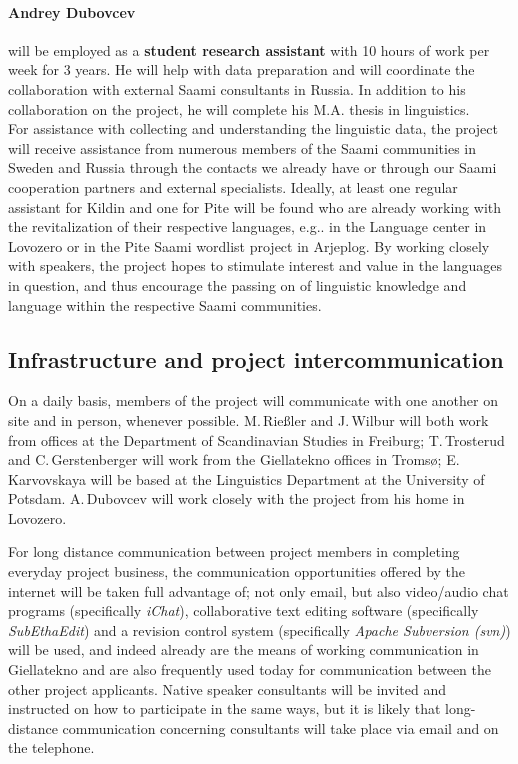 \documentclass[a4paper,12pt]{article}
\begin{document}
{{\paragraph{Andrey Dubovcev} will be employed as a \textbf{student research assistant} with 10 hours of work per week for 3 years. He will help with data preparation and will coordinate the collaboration with external Saami consultants in Russia. In addition to his collaboration on the project, he will complete his M.A. thesis in linguistics.\\

For assistance with collecting and understanding the linguistic data, the project will receive assistance from numerous members of the Saami communities in Sweden and Russia through the contacts we already have or through our Saami cooperation partners and external specialists. 
Ideally, at least one regular assistant for Kildin and one for Pite will be found who are already working with the revitalization of their respective languages, e.g.. in the Language center in Lovozero or in the Pite Saami wordlist project in Arjeplog. By working closely with speakers, the project hopes to stimulate interest and value in the languages in question, and thus encourage the passing on of linguistic knowledge and language within the respective Saami communities.

\subsection{Infrastructure and project intercommunication}
On a daily basis, members of the project will communicate with one another on site and in person, whenever possible. M.\,Rießler and J.\,Wilbur will both work from offices at the Department of Scandinavian Studies in Freiburg; T.\,Trosterud and C.\,Gerstenberger will work from the Giellatekno offices in Tromsø; E.\,Karvovskaya will be based at the Linguistics Department at the University of Potsdam. A.\,Dubovcev will work closely with the project from his home in Lovozero.

For long distance communication between project members in completing everyday project business, the communication opportunities offered by the internet will be taken full advantage of; not only email, but also video/audio chat programs (specifically \textit{iChat}), collaborative text editing software (specifically \textit{SubEthaEdit}) and a revision control system (specifically \textit{Apache Subversion (svn)}) will be used, and indeed already are the means of working communication in Giellatekno and are also frequently used today for communication between the other project applicants. Native speaker consultants will be invited and instructed on how to participate in the same ways, but it is likely that long-distance communication concerning consultants will take place via email and on the telephone.

}}
\end{document}
